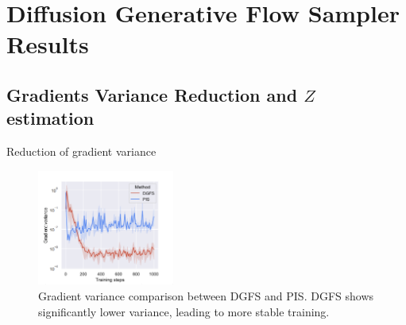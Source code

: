 \documentclass[aspectratio=169,xcolor=dvipsnames]{beamer}
\begin{document}
\section{Diffusion Generative Flow Sampler Results}

\subsection{Gradients Variance Reduction and $Z$ estimation}

\begin{frame}[t]{Reduction of gradient variance}
\footnotesize

\begin{figure}
    \centering
    \includegraphics[width=0.4\textwidth]{figures/grad_variance.png}
    \caption{Gradient variance comparison between DGFS and PIS. DGFS shows significantly lower variance, leading to more stable training.}
\end{figure}

\end{frame}
\end{document}
